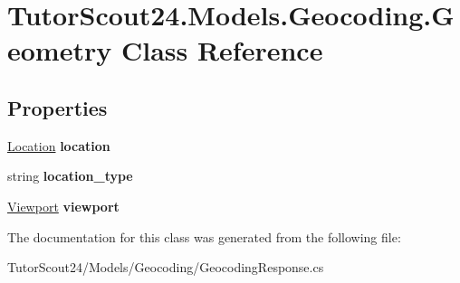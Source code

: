 \hypertarget{class_tutor_scout24_1_1_models_1_1_geocoding_1_1_geometry}{}\section{Tutor\+Scout24.\+Models.\+Geocoding.\+Geometry Class Reference}
\label{class_tutor_scout24_1_1_models_1_1_geocoding_1_1_geometry}
\subsection*{Properties}
\begin{DoxyCompactItemize}
\item 
\mbox{\label{class_tutor_scout24_1_1_models_1_1_geocoding_1_1_geometry_aad9d754985f0d6c2b93da4fde9607194}} 
\mbox{\hyperlink{class_tutor_scout24_1_1_models_1_1_geocoding_1_1_location}{Location}} {\bfseries location}
\item 
\mbox{\label{class_tutor_scout24_1_1_models_1_1_geocoding_1_1_geometry_a4d97446200b6feab5257477e762844c8}} 
string {\bfseries location\+\_\+type}
\item 
\mbox{\label{class_tutor_scout24_1_1_models_1_1_geocoding_1_1_geometry_adc492ebcab1c466cc58382e90d6cb2fc}} 
\mbox{\hyperlink{class_tutor_scout24_1_1_models_1_1_geocoding_1_1_viewport}{Viewport}} {\bfseries viewport}
\end{DoxyCompactItemize}


The documentation for this class was generated from the following file\+:\begin{DoxyCompactItemize}
\item 
Tutor\+Scout24/\+Models/\+Geocoding/Geocoding\+Response.\+cs\end{DoxyCompactItemize}
